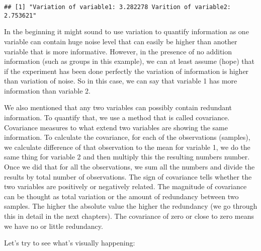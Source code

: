 \documentclass[
]{book}
\newenvironment{Shaded}{\begin{snugshade}}{\end{snugshade}}
\newcommand{\CommentTok}[1]{\textcolor[rgb]{0.56,0.35,0.01}{\textit{#1}}}
\newcommand{\KeywordTok}[1]{\textcolor[rgb]{0.13,0.29,0.53}{\textbf{#1}}}
\newcommand{\NormalTok}[1]{#1}
\newcommand{\StringTok}[1]{\textcolor[rgb]{0.31,0.60,0.02}{#1}}
\theoremstyle{definition}
\theoremstyle{definition}
\theoremstyle{definition}
\theoremstyle{remark}
\begin{document}
\begin{Shaded}
\end{Shaded}

\begin{verbatim}
## [1] "Variation of variable1: 3.282278 Varition of variable2: 2.753621"
\end{verbatim}

In the beginning it might sound to use variation to quantify information as one variable can contain huge noise level that can easily be higher than another variable that is more informative. However, in the presence of no addition information (such as groups in this example), we can at least assume (hope) that if the experiment has been done perfectly the variation of information is higher than variation of noise. So in this case, we can say that variable 1 has more information than variable 2.

We also mentioned that any two variables can possibly contain redundant information. To quantify that, we use a method that is called covariance. Covariance measures to what extend two variables are showing the same information. To calculate the covariance, for each of the observations (samples), we calculate difference of that observation to the mean for variable 1, we do the same thing for variable 2 and then multiply this the resulting numbers number. Once we did that for all the observations, we sum all the numbers and divide the results by total number of observations. The sign of covariance tells whether the two variables are positively or negatively related. The magnitude of covariance can be thought as total variation or the amount of redundancy between two samples. The higher the absolute value the higher the redundancy (we go through this in detail in the next chapters). The covariance of zero or close to zero means we have no or little redundancy.

Let's try to see what's visually happening:
\end{document}
